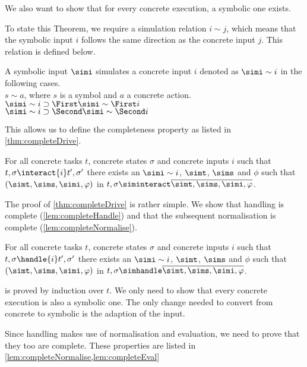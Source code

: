 We also want to show that for every concrete execution, a symbolic one exists.

To state this Theorem, we require a simulation relation $i\sim j$, which means that the symbolic input $i$ follows the same direction as the concrete input $j$.
This relation is defined below.

\begin{definition}
  A symbolic input $\simi$ simulates a concrete input $i$ denoted as $\simi\sim i$ in the following cases.\\
  $s\sim a$, where $s$ is a symbol and $a$ a concrete action.\\
  $\simi\sim i\implies \First \simi \sim \First i$\\
  $\simi\sim i\implies \Second \simi \sim \Second i$
\end{definition}

This allows us to define the completeness property as listed in \cref{thm:completeDrive}.

\begin{theorem}
  \label{thm:completeDrive}
  For all concrete tasks $t$, concrete states $\sigma$ and concrete inputs $i$ such that $t,\sigma \interact{i} t',\sigma'$
there exists an $\simi\sim i$, $\simt$, $\sims$ and $\phi$ such that $(\simt,\sims,\simi,\phi)$ in $t,\sigma\siminteract \overline{\simt,\sims,\simi,\phi}$.
\end{theorem}


The proof of \cref{thm:completeDrive} is rather simple.
We show that handling is complete (\cref{lem:completeHandle})
and that the subsequent normalisation is complete (\cref{lem:completeNormalise}).


\begin{lemma}
  \label{lem:completeHandle}
  For all concrete tasks $t$, concrete states $\sigma$ and concrete inputs $i$ such that $t,\sigma \handle{i} t',\sigma'$
  there exists an $\simi\sim i$, $\simt$, $\sims$ and $\phi$ such that $(\simt,\sims,\simi,\phi)$ in $t,\sigma\simhandle \overline{\simt,\sims,\simi,\phi}$.
\end{lemma}

 is proved by induction over $t$.
We only need to show that every concrete execution is also a symbolic one.
The only change needed to convert from concrete to symbolic is the adaption of the input.

Since handling makes use of normalisation and evaluation, we need to prove that they too are complete.
These properties are listed in \cref{lem:completeNormalise,lem:completeEval}

